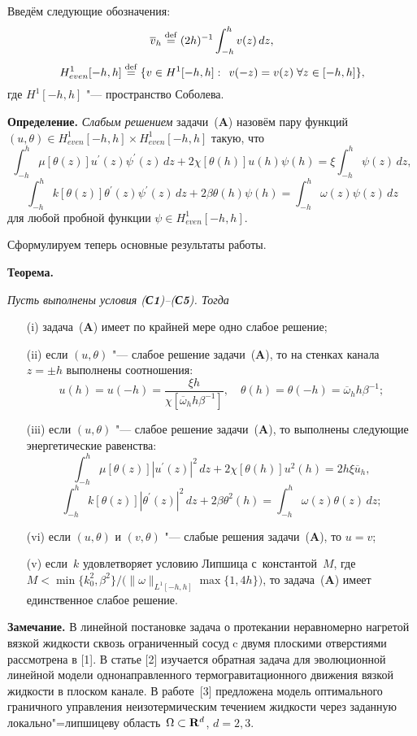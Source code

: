 Введём следующие обозначения:
$$
\overline{v}_h\stackrel{{\rm def}}{=}(2h)^{-1}\int_{-h}^hv(z)\,dz,
$$
$$
H^1_{ even}[-h,h]\stackrel{{\rm def}}{=}\{v\in H^1[-h,h]:\;\, v(-z)=v(z)\; \forall z\in [-h,h]\},
$$
где $H^1[-h,h]$ "--- пространство Соболева.

\medskip
{\bf Определение.} {\it Слабым решением} задачи~({\bf A}) назовём пару функций ${(u, \theta)\in H^1_{even}[-h,h]\times H^1_{even}[-h,h]}$ такую, что
$$
\int_{-h}^h\mu[\theta(z)]u^\prime(z) \psi^\prime(z)\,dz
+2\chi[\theta(h)]u(h)\psi(h)
=\xi\int_{-h}^h \psi(z)\,dz,
$$
$$
\int_{-h}^hk[\theta(z)]\theta^\prime(z) \psi^\prime(z)\,dz
+2\beta\theta(h)\psi(h)
=\int_{-h}^h \omega(z)\psi(z)\,dz
$$
для любой пробной функции ${\psi\in H^1_{even}[-h,h]}$.
\medskip

Сформулируем теперь основные результаты работы.

\medskip
\textbf{Теорема.}
{\it
Пусть выполнены условия {\rm({\bf С1})}--{\rm({\bf С5})}. Тогда
\begin{itemize}
\item[{\rm (i)}] задача~{\rm({\bf A})} имеет по крайней мере одно слабое решение;
\item[{\rm (ii)}] если ${(u,\theta)}$ "--- слабое решение задачи~{\rm({\bf A})}, то на стенках канала ${z=\pm h}$ выполнены соотношения:
$$
u(h)=u(-h)=\frac{\xi h}{\chi[\overline{\omega}_h h\beta^{-1}]},\quad \theta(h)=\theta(-h)=\overline{\omega}_h h\beta^{-1};
$$
\item[{\rm (iii)}]
если ${(u,\theta)}$ "--- слабое решение задачи~{\rm({\bf A})}, то выполнены следующие энергетические равенства:
$$
\int_{-h}^h\mu[\theta(z)]|u^\prime(z)|^2\,dz
+2\chi[\theta(h)]u^2(h)
=2h\xi\overline{u}_h,
$$
$$
\int_{-h}^hk[\theta(z)]|\theta^\prime(z)|^2\,dz
+2\beta\theta^2(h)
=\int_{-h}^h\omega(z) \theta(z)\,dz;
$$
\item[{\rm (vi)}] если $(u,\theta)$ и $(v,\theta)$ "--- слабые решения задачи~{\rm({\bf A})}, то ${u=v}$;
\item[{\rm (v)}] если~$k$ удовлетворяет условию Липшица
с~константой~$M$, где ${M<{\min\{k_0^2,\beta^2\}}/\big({\|\omega\|_{L^1[-h,h]}\max\{1,4h\}}\big)}$,
то задача~{\rm({\bf A})} имеет единственное слабое решение.
\end{itemize}
}

{\bf Замечание.} В линейной постановке задача о протекании неравномерно нагретой вязкой жидкости сквозь ограниченный сосуд c двумя плоскими отверстиями рассмотрена в [1]. В статье [2] изучается обратная задача для эволюционной линейной модели одно\-направленного термогравитационного движения вязкой жидкости в плоском канале. В работе~[3] предложена модель оптимального граничного управления неизотермическим течением жидкости через заданную локально"=липшицеву область~${\Omega\subset{\bf R}^d}$, ${d=2,3}$.

